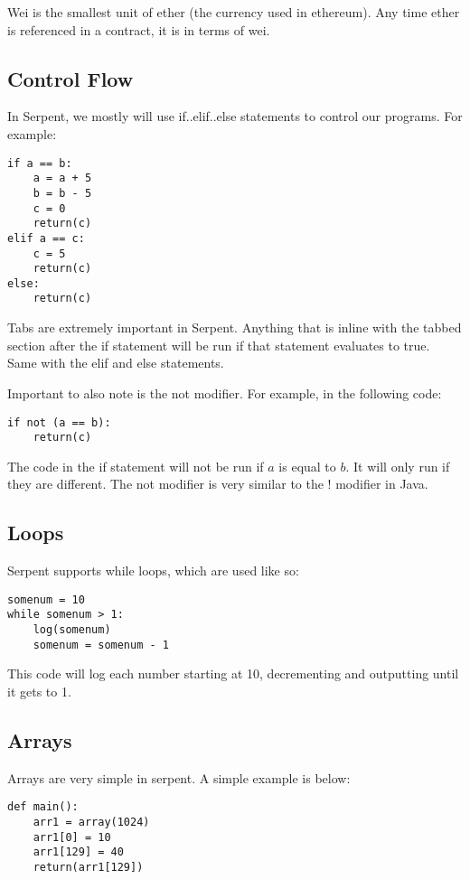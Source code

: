 \documentclass[12pt]{article}
\begin{document}
Wei is the smallest unit of ether (the currency used in ethereum). Any time ether is referenced in a contract, it is in terms of wei.

\subsection{Control Flow}

	In Serpent, we mostly will use if..elif..else statements to control our programs. For example:
	
\begin{lstlisting}
if a == b:
	a = a + 5
	b = b - 5
	c = 0
	return(c)
elif a == c: 
	c = 5
	return(c)
else:
	return(c)
\end{lstlisting}

	Tabs are extremely important in Serpent. Anything that is inline with the tabbed section after the if statement will be run if that statement evaluates to true. Same with the elif and else statements. \cite{Serpent}
	
	Important to also note is the not modifier. For example, in the following code:
	
\begin{lstlisting}
if not (a == b):
	return(c)
\end{lstlisting}

The code in the if statement will not be run if $a$ is equal to $b$. It will only run if they are different. The not modifier is very similar to the ! modifier in Java. \cite{Serpent}
	
\subsection{Loops}
Serpent supports while loops, which are used like so:
\begin{lstlisting}
somenum = 10
while somenum > 1:
	log(somenum)
	somenum = somenum - 1
\end{lstlisting}

This code will log each number starting at 10, decrementing and outputting until it gets to 1. \cite{Serpent 1.0 (old)}

\subsection{Arrays}
Arrays are very simple in serpent. A simple example is below:
\begin{lstlisting}
def main():
	arr1 = array(1024)
	arr1[0] = 10
	arr1[129] = 40
	return(arr1[129])
\end{lstlisting}
\end{document}
